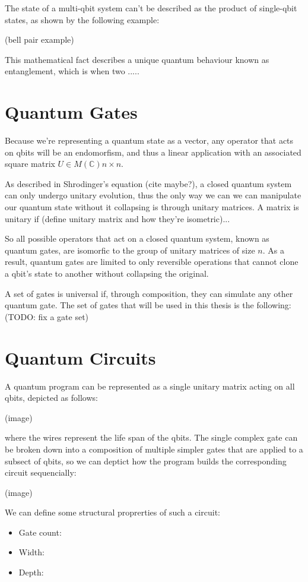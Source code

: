 The state of a multi-qbit system can't be described as the product of single-qbit states, as shown by the following example:

(bell pair example)

This mathematical fact describes a unique quantum behaviour known as entanglement, which is when two .....

\section{Quantum Gates}
Because we're representing a quantum state as a vector, any operator that acts on qbits will be an endomorfism, and thus a linear application with an associated square matrix $ U \in M(\mathbb{C})n\times n $.

As described in Shrodinger's equation (cite maybe?), a closed quantum system can only undergo unitary evolution, thus the only way we can we can manipulate our quantum state without it collapsing is through unitary matrices. A matrix is unitary if (define unitary matrix and how they're isometric)...

So all possible operators that act on a closed quantum system, known as quantum gates, are isomorfic to the group of unitary matrices of size $ n $. As a result, quantum gates are limited to only reversible operations that cannot clone a qbit's state to another without collapsing the original.

A set of gates is universal if, through composition, they can simulate any other quantum gate. The set of gates that will be used in this thesis is the following: (TODO: fix a gate set)

\section{Quantum Circuits}

A quantum program can be represented as a single unitary matrix acting on all qbits, depicted as follows:

(image)

where the wires represent the life span of the qbits. The single complex gate can be broken down into a composition of multiple simpler gates that are applied to a subsect of qbits, so we can deptict how the program builds the corresponding circuit sequencially:

(image)

We can define some structural proprerties of such a circuit:
\begin{itemize}
\item Gate count: 
\item Width: 
\item Depth:
\end{itemize}

